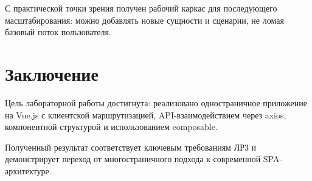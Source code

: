 \documentclass[a4paper,12pt]{article}
\begin{document}
С практической точки зрения получен рабочий каркас для последующего масштабирования: можно добавлять новые сущности и сценарии, не ломая базовый поток пользователя.

\section{Заключение}
Цель лабораторной работы достигнута: реализовано одностраничное приложение на Vue.js с клиентской маршрутизацией, API-взаимодействием через axios, компонентной структурой и использованием composable.

Полученный результат соответствует ключевым требованиям ЛР3 и демонстрирует переход от многостраничного подхода к современной SPA-архитектуре.
\end{document}
